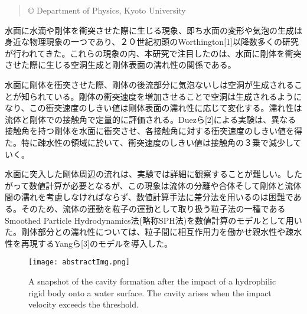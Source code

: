 \documentclass[a4paper]{jsarticle}
\begin{document}
\begin{center}
\begin{abstract}
{%
\hspace{-4pt}
{\fontsize{10.5pt}{12.6pt}\selectfont \copyright}
{\fontsize{10.5pt}{12.6pt} Department of Physics, Kyoto University}
}
\end{abstract}
\end{center}
\vspace{5pt}
{\fontsize{10.5pt}{14pt}\selectfont 

 水面に水滴や剛体を衝突させた際に生じる現象、即ち水面の変形や気泡の生成は身近な物理現象の一つであり、２０世紀初頭のWorthington[1]以降数多くの研究が行われてきた。これらの現象の内、本研究で注目したのは、水面に剛体を衝突させた際に生じる空洞生成と剛体表面の濡れ性の関係である。

 水面に剛体を衝突させた際、剛体の後流部分に気泡ないしは空洞が生成されることが知られている。剛体の衝突速度を増加させることで空洞は生成されるようになり、この衝突速度のしきい値は剛体表面の濡れ性に応じて変化する。濡れ性は流体と剛体での接触角で定量的に評価される。Duezら[2]による実験は、異なる接触角を持つ剛体を水面に衝突させ、各接触角に対する衝突速度のしきい値を得た。特に疎水性の領域に於いて、衝突速度のしきい値は接触角の３乗で減少していく。

 水面に突入した剛体周辺の流れは、実験では詳細に観察することが難しい。したがって数値計算が必要となるが、この現象は流体の分離や合体そして剛体と流体間の濡れを考慮しなければならず、数値計算手法に差分法を用いるのは困難である。そのため、流体の運動を粒子の運動として取り扱う粒子法の一種であるSmoothed Particle Hydrodynamics法(略称SPH法)を数値計算のモデルとして用いた。剛体部分との濡れ性については、粒子間に相互作用力を働かせ親水性や疎水性を再現するYangら[3]のモデルを導入した。

 \begin{figure}[h]
   \begin{center}
     \texttt{[image: abstractImg.png]}
     \caption{A snapshot of the cavity formation after the impact of a hydrophilic rigid body onto a water surface.
The cavity arises when the impact velocity exceeds the threshold. }
   \end{center}
 \end{figure}

}
\end{document}

